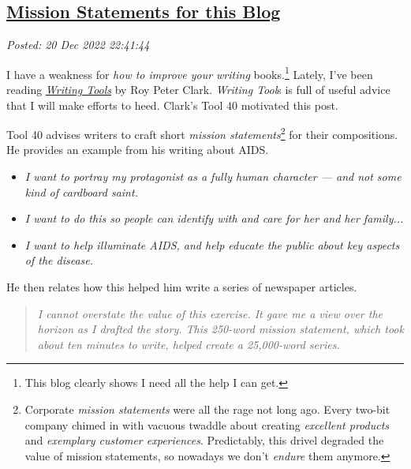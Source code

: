 %

\subsection*{\href{https://analyzethedatanotthedrivel.org/2022/12/20/mission-statements-for-this-blog/}{Mission Statements for this Blog}}


\noindent\emph{Posted: 20 Dec 2022 22:41:44}
\vspace{6pt}

I have a weakness for \emph{how to improve your writing}
books.\footnote{This blog clearly shows I need all the help I can get.
} Lately, I've been reading
\href{https://www.amazon.com/Writing-Tools-Essential-Strategies-Writer/dp/0316014990}{\emph{Writing
Tools}} by Roy Peter Clark. \emph{Writing Tool}s is full of useful
advice that I will make efforts to heed. Clark's Tool 40 motivated this
post.

Tool 40 advises writers to craft short \emph{mission
statements}\footnote{  Corporate \emph{mission statements} were all the rage not long ago.
  Every two-bit company chimed in with vacuous twaddle about creating
  \emph{excellent products} and \emph{exemplary customer experiences}.
  Predictably, this drivel degraded the value of mission statements, so
  nowadays we don't \emph{endure} them
  anymore.} for their compositions. He provides an example from his writing about
AIDS.

\begin{itemize}
\tightlist
\item
  \emph{I want to portray my protagonist as a fully human character ---
  and not some kind of cardboard saint.}
\item
  \emph{I want to do this so people can identify with and care for her
  and her family...}
\item
  \emph{I want to help illuminate AIDS, and help educate the public
  about key aspects of the disease.}
\end{itemize}


He then relates how this helped him write a series of newspaper
articles.

\begin{quote}
\emph{I cannot overstate the value of this exercise. It gave me a view
over the horizon as I drafted the story. This 250-word mission
statement, which took about ten minutes to write, helped create a
25,000-word series.}
\end{quote}

